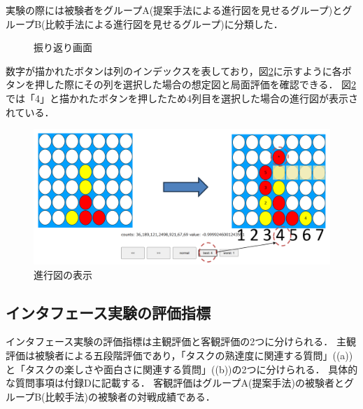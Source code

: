 実験の際には被験者をグループA(提案手法による進行図を見せるグループ)とグループB(比較手法による進行図を見せるグループ)に分類した．
\begin{figure}[htbp]
	\centering
    \setlength{\fboxsep}{1pt} %
    \setlength{\fboxrule}{1pt} %
	\caption{振り返り画面}
	\label{fig:lookBack}
\end{figure}
数字が描かれたボタンは列のインデックスを表しており，図\ref{fig:trajSystem}に示すように各ボタンを押した際にその列を選択した場合の想定図と局面評価を確認できる．
図\ref{fig:trajSystem}では「4」と描かれたボタンを押したため4列目を選択した場合の進行図が表示されている．
\begin{figure}[htbp]
    \centering
    \includegraphics[width=\linewidth]{./figure/4-traj.png}
	\caption{進行図の表示}
	\label{fig:trajSystem}
\end{figure}
\subsection{インタフェース実験の評価指標}
インタフェース実験の評価指標は主観評価と客観評価の2つに分けられる．
主観評価は被験者による五段階評価であり，「タスクの熟達度に関連する質問」((a))と「タスクの楽しさや面白さに関連する質問」((b))の2つに分けられる．
具体的な質問事項は付録Dに記載する．
客観評価はグループA(提案手法)の被験者とグループB(比較手法)の被験者の対戦成績である．

